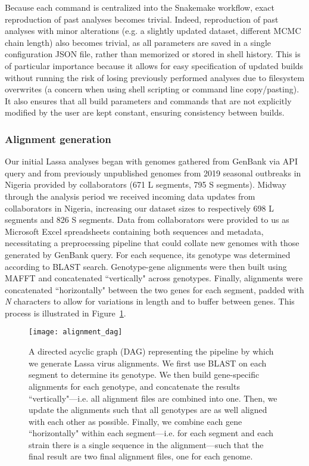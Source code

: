 Because each command is centralized into the Snakemake workflow, exact reproduction of past analyses becomes trivial.
Indeed, reproduction of past analyses with minor alterations (e.g. a slightly updated dataset, different MCMC chain length) also becomes trivial, as all parameters are saved in a single configuration JSON file, rather than memorized or stored in shell history.
This is of particular importance because it allows for easy specification of updated builds without running the risk of losing previously performed analyses due to filesystem overwrites (a concern when using shell scripting or command line copy/pasting).
It also ensures that all build parameters and commands that are not explicitly modified by the user are kept constant, ensuring consistency between builds.

\subsubsection{Alignment generation}

Our initial Lassa analyses began with genomes gathered from GenBank via API query and from previously unpublished genomes from 2019 seasonal outbreaks in Nigeria provided by collaborators (671 L segments, 795 S segments). %
Midway through the analysis period we received incoming data updates from collaborators in Nigeria, increasing our dataset sizes to respectively 698 L segments and 826 S segments.
Data from collaborators were provided to us as Microsoft Excel spreadsheets containing both sequences and metadata, necessitating a preprocessing pipeline that could collate new genomes with those generated by GenBank query.
For each sequence, its genotype was determined according to BLAST search.
Genotype-gene alignments were then built using MAFFT and concatenated ``vertically" across genotypes. %
Finally, alignments were concatenated ``horizontally" between the two genes for each segment, padded with \textit{N} characters to allow for variations in length and to buffer between genes.
This process is illustrated in Figure~\ref{fig:alignment_dag}.

\begin{figure}[ht]
  \centering
  \medskip
  \texttt{[image: alignment\_dag]}
  \caption[Lassa alignment pipeline]{A directed acyclic graph (DAG) representing the pipeline by which we generate Lassa virus alignments. We first use BLAST on each segment to determine its genotype. We then build gene-specific alignments for each genotype, and concatenate the results ``vertically"---i.e. all alignment files are combined into one. Then, we update the alignments such that all genotypes are as well aligned with each other as possible. Finally, we combine each gene ``horizontally" within each segment---i.e. for each segment and each strain there is a single sequence in the alignment---such that the final result are two final alignment files, one for each genome.}
  \label{fig:alignment_dag}
\end{figure}

